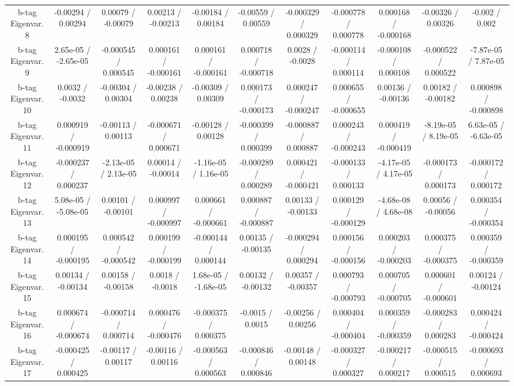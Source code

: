 \begin{table}[htbp]
\begin{center}
\begin{tabular}{|c|c|c|c|c|c|c|c|c|c|c|}
  b-tag Eigenvar. 8 & -0.00294 / 0.00294 & 0.00079 / -0.00079 & 0.00213 / -0.00213 & -0.00184 / 0.00184 & -0.00559 / 0.00559 & -0.000329 / 0.000329 & -0.000778 / 0.000778 & 0.000168 / -0.000168 & -0.00326 / 0.00326 & -0.002 / 0.002 \\ 
  b-tag Eigenvar. 9 & 2.65e-05 / -2.65e-05 & -0.000545 / 0.000545 & 0.000161 / -0.000161 & 0.000161 / -0.000161 & 0.000718 / -0.000718 & 0.0028 / -0.0028 & -0.000114 / 0.000114 & -0.000108 / 0.000108 & -0.000522 / 0.000522 & -7.87e-05 / 7.87e-05 \\ 
  b-tag Eigenvar. 10 & 0.0032 / -0.0032 & -0.00304 / 0.00304 & -0.00238 / 0.00238 & -0.00309 / 0.00309 & 0.000173 / -0.000173 & 0.000247 / -0.000247 & 0.000655 / -0.000655 & 0.00136 / -0.00136 & 0.00182 / -0.00182 & 0.000898 / -0.000898 \\ 
  b-tag Eigenvar. 11 & 0.000919 / -0.000919 & -0.00113 / 0.00113 & -0.000671 / 0.000671 & -0.00128 / 0.00128 & -0.000399 / 0.000399 & -0.000887 / 0.000887 & 0.000243 / -0.000243 & 0.000419 / -0.000419 & -8.19e-05 / 8.19e-05 & 6.63e-05 / -6.63e-05 \\ 
  b-tag Eigenvar. 12 & -0.000237 / 0.000237 & -2.13e-05 / 2.13e-05 & 0.00014 / -0.00014 & -1.16e-05 / 1.16e-05 & -0.000289 / 0.000289 & 0.000421 / -0.000421 & -0.000133 / 0.000133 & -4.17e-05 / 4.17e-05 & -0.000173 / 0.000173 & -0.000172 / 0.000172 \\ 
  b-tag Eigenvar. 13 & 5.08e-05 / -5.08e-05 & 0.00101 / -0.00101 & 0.000997 / -0.000997 & 0.000661 / -0.000661 & 0.000887 / -0.000887 & 0.00133 / -0.00133 & 0.000129 / -0.000129 & -4.68e-08 / 4.68e-08 & 0.00056 / -0.00056 & 0.000354 / -0.000354 \\ 
  b-tag Eigenvar. 14 & 0.000195 / -0.000195 & 0.000542 / -0.000542 & 0.000199 / -0.000199 & -0.000144 / 0.000144 & 0.00135 / -0.00135 & -0.000294 / 0.000294 & 0.000156 / -0.000156 & 0.000203 / -0.000203 & 0.000375 / -0.000375 & 0.000359 / -0.000359 \\ 
  b-tag Eigenvar. 15 & 0.00134 / -0.00134 & 0.00158 / -0.00158 & 0.0018 / -0.0018 & 1.68e-05 / -1.68e-05 & 0.00132 / -0.00132 & 0.00357 / -0.00357 & 0.000793 / -0.000793 & 0.000705 / -0.000705 & 0.000601 / -0.000601 & 0.00124 / -0.00124 \\ 
  b-tag Eigenvar. 16 & 0.000674 / -0.000674 & -0.000714 / 0.000714 & 0.000476 / -0.000476 & -0.000375 / 0.000375 & -0.0015 / 0.0015 & -0.00256 / 0.00256 & 0.000404 / -0.000404 & 0.000359 / -0.000359 & -0.000283 / 0.000283 & 0.000424 / -0.000424 \\ 
  b-tag Eigenvar. 17 & -0.000425 / 0.000425 & -0.00117 / 0.00117 & -0.00116 / 0.00116 & -0.000563 / 0.000563 & -0.000846 / 0.000846 & -0.00148 / 0.00148 & -0.000327 / 0.000327 & -0.000217 / 0.000217 & -0.000515 / 0.000515 & -0.000693 / 0.000693 \\ 

\end{tabular}
\end{center}
\end{table}
